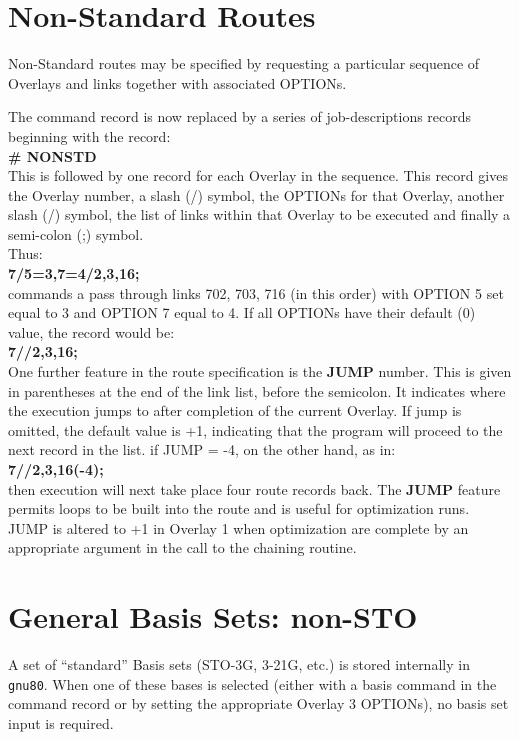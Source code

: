 \section{\sf Non-Standard Routes}
\label{nonstd}
Non-Standard routes may be specified by requesting a particular
sequence of Overlays and links together with associated OPTIONs. 

The
command record is now replaced by a series of
job-descriptions records beginning with the record:  \\ 
\vspace{0.25cm}
{\bf \# NONSTD}  \\
\vspace{0.25cm}
This is
followed by one record for each Overlay in the sequence. This record gives
the Overlay number, a slash (/) symbol, the OPTIONs for that Overlay, 
another slash (/) symbol, the
list of links within that Overlay to be executed 
and finally a semi-colon (;) symbol.  \\
Thus:  \\
\vspace{0.25cm}
{\bf 7/5=3,7=4/2,3,16;}  \\
\vspace{0.25cm}
commands a pass through links 702, 703, 716 (in this order) with OPTION 5
set equal to 3 and OPTION 7 equal to 4. If all OPTIONs have their
default (0) value, the record would be:  \\
\vspace{0.25cm}
{\bf 7//2,3,16;}  \\
\vspace{0.25cm}
One further feature in the route specification is the {\bf JUMP} number.
This is given in parentheses at the end of the link list, before the
semicolon. It indicates where the execution jumps to after completion
of the current Overlay. If jump is omitted, the default value is +1,
indicating that the program will proceed to the next record in the list.
if JUMP = -4, on the other hand, as in:  \\
\vspace{0.25cm}
{\bf 7//2,3,16(-4);}  \\
\vspace{0.25cm}
then execution will next take place four route records back. The {\bf JUMP}
feature permits loops to be built into the route and is useful for
optimization runs. JUMP is altered to +1 in Overlay 1 when optimization
are complete by an appropriate argument in the call to the chaining
routine.
\section{\sf General Basis Sets: non-STO}
\label{genbasis}
A set of ``standard'' Basis sets (STO-3G, 3-21G, etc.) 
is stored internally in
{\tt gnu80}.  When one of these bases is selected (either with a basis
command in the command record or by setting the appropriate Overlay 3
OPTIONs), no basis set input is required.  

